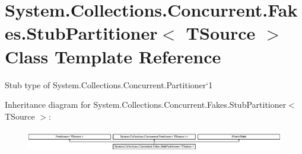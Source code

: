 \hypertarget{class_system_1_1_collections_1_1_concurrent_1_1_fakes_1_1_stub_partitioner_3_01_t_source_01_4}{\section{System.\-Collections.\-Concurrent.\-Fakes.\-Stub\-Partitioner$<$ T\-Source $>$ Class Template Reference}
\label{class_system_1_1_collections_1_1_concurrent_1_1_fakes_1_1_stub_partitioner_3_01_t_source_01_4}
}


Stub type of System.\-Collections.\-Concurrent.\-Partitioner`1 


Inheritance diagram for System.\-Collections.\-Concurrent.\-Fakes.\-Stub\-Partitioner$<$ T\-Source $>$\-:\begin{figure}[H]
\begin{center}
\leavevmode
\includegraphics[height=0.954817cm]{class_system_1_1_collections_1_1_concurrent_1_1_fakes_1_1_stub_partitioner_3_01_t_source_01_4}
\end{center}
\end{figure}
